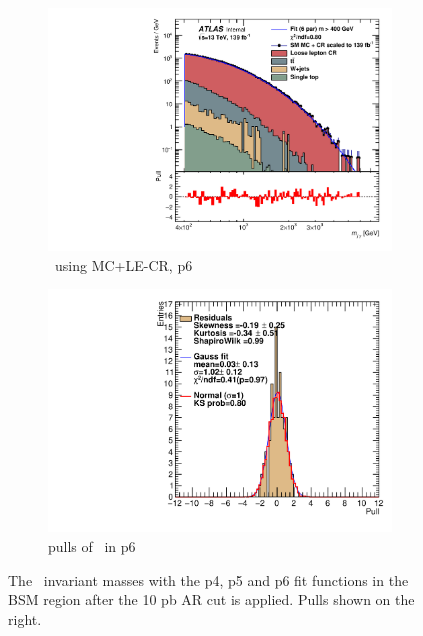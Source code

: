 \begin{figure}[H]
\begin{subfigure}[h]{0.38\linewidth}
    \includegraphics[scale=0.3]{figs/ch6/fit/variable_nosmooth/p6/10PB/output_SMMCplusCR_Mjg_p6.pdf}%
    \caption{\mjph \ using MC+LE-CR, p6}
    \end{subfigure}
    \hfill
    \begin{subfigure}[h]{0.4\linewidth}
    \includegraphics[scale=0.32]{figs/ch6/fit/variable_nosmooth/p6/10PB/pull_SMMCplusCR_Mjg_p6.pdf}%
    \caption{pulls of \mjph \ in p6}
    \end{subfigure}
    \hfill
    \caption{The \mjph \ invariant masses with the p4, p5 and p6 fit functions in the BSM region after the 10 pb AR cut is applied. Pulls shown on the right.}
\label{fig:mjg-fit-pulls}
\end{figure}

\newpage


